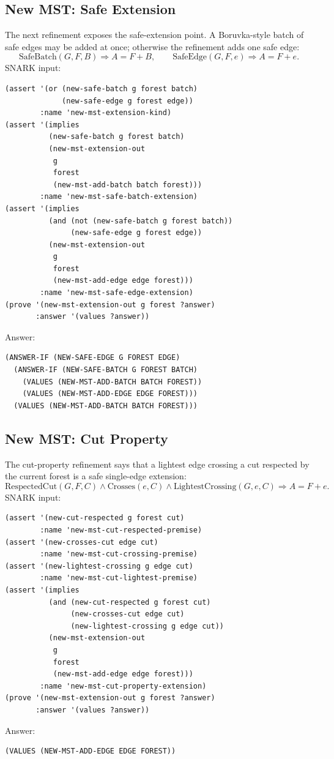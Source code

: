 \documentclass[runningheads]{llncs}
\begin{document}
\subsection{New MST: Safe Extension}

The next refinement exposes the safe-extension point.  A Boruvka-style batch of
safe edges may be added at once; otherwise the refinement adds one safe edge:
\[
  \mathrm{SafeBatch}(G,F,B)\Rightarrow A=F+B,\qquad
  \mathrm{SafeEdge}(G,F,e)\Rightarrow A=F+e.
\]
SNARK input:
\begin{lstlisting}
(assert '(or (new-safe-batch g forest batch)
             (new-safe-edge g forest edge))
        :name 'new-mst-extension-kind)
(assert '(implies
          (new-safe-batch g forest batch)
          (new-mst-extension-out
           g
           forest
           (new-mst-add-batch batch forest)))
        :name 'new-mst-safe-batch-extension)
(assert '(implies
          (and (not (new-safe-batch g forest batch))
               (new-safe-edge g forest edge))
          (new-mst-extension-out
           g
           forest
           (new-mst-add-edge edge forest)))
        :name 'new-mst-safe-edge-extension)
(prove '(new-mst-extension-out g forest ?answer)
       :answer '(values ?answer))
\end{lstlisting}
Answer:
\begin{lstlisting}
(ANSWER-IF (NEW-SAFE-EDGE G FOREST EDGE)
  (ANSWER-IF (NEW-SAFE-BATCH G FOREST BATCH)
    (VALUES (NEW-MST-ADD-BATCH BATCH FOREST))
    (VALUES (NEW-MST-ADD-EDGE EDGE FOREST)))
  (VALUES (NEW-MST-ADD-BATCH BATCH FOREST)))
\end{lstlisting}

\subsection{New MST: Cut Property}

The cut-property refinement says that a lightest edge crossing a cut respected
by the current forest is a safe single-edge extension:
\[
  \mathrm{RespectedCut}(G,F,C)\land
  \mathrm{Crosses}(e,C)\land
  \mathrm{LightestCrossing}(G,e,C)
  \Rightarrow A=F+e.
\]
SNARK input:
\begin{lstlisting}
(assert '(new-cut-respected g forest cut)
        :name 'new-mst-cut-respected-premise)
(assert '(new-crosses-cut edge cut)
        :name 'new-mst-cut-crossing-premise)
(assert '(new-lightest-crossing g edge cut)
        :name 'new-mst-cut-lightest-premise)
(assert '(implies
          (and (new-cut-respected g forest cut)
               (new-crosses-cut edge cut)
               (new-lightest-crossing g edge cut))
          (new-mst-extension-out
           g
           forest
           (new-mst-add-edge edge forest)))
        :name 'new-mst-cut-property-extension)
(prove '(new-mst-extension-out g forest ?answer)
       :answer '(values ?answer))
\end{lstlisting}
Answer:
\begin{lstlisting}
(VALUES (NEW-MST-ADD-EDGE EDGE FOREST))
\end{lstlisting}
\end{document}
